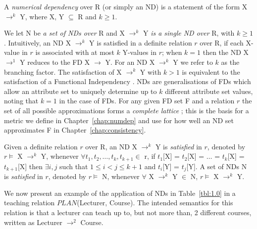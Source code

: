 \begin{definition}
\begin{rm}
A {\em numerical dependency} over R (or simply an ND)
is a statement of the form X $\to^k$ Y, where X, Y $\subseteq$ R and $k \ge 1$.
\end{rm}
\end{definition}
\smallskip
{}
We let N be {\em a set of NDs over} R and X $\to^k$ Y 
{\em is a single ND over} R, with $k \ge 1$.
Intuitively, an ND X $\to^k$ Y is satisfied in a definite relation $r$ over R,
if each X-value in $r$ is associated with at most $k$ Y-values in $r$;
when $k = 1$ then the ND X $\to^1$ Y reduces to the FD X $\to$ Y. For
an ND X $\to^k$ Y we refer to $k$ as the branching factor. The 
satisfaction of X $\to^k$ Y with $k > 1$ is equivalent to the
satisfaction of a Functional Independency \cite{gl90}.
NDs are generalisations of FDs which
allow an attribute set to uniquely determine up to $k$ different attribute
set values, noting that $k = 1$ in the case of FDs. For any given FD
set F and a relation $r$ the set of all possible approximations forms a
{\em complete lattice} \cite{dp90}; this is the basis for a metric we define
in Chapter~\ref{chap:numdep} and use for how well an ND set
approximates F in Chapter~\ref{chap:consistency}. 


\begin{definition}[Satisfaction of an ND]\label{def:sat-nd}
\begin{rm}
Given a definite relation $r$ over R,
an ND X $\to^k$ Y is {\em satisfied} in $r$,
denoted by $r \models$ X $\to^k$ Y, whenever
$\forall t_1, t_2, \ldots, t_k, t_{k+1} \in$ r, if 
$t_1$[X] = $t_2$[X] = $\ldots$ = $t_k$[X] = $t_{k+1}$[X] then 
$\exists i,j$ such that $1 \le i < j \le k+1$
and $t_i$[Y] = $t_j$[Y].
A set of NDs N is {\em satisfied} in $r$,
denoted by $r \models$ N, whenever
$\forall$ X $\to^k$ Y $\in$ N, $r \models$ X $\to^k$ Y.
\end{rm}
\end{definition}

We now present an
example of the application of NDs in Table~\ref{tbl:1.0}  in a
teaching relation $PLAN$(Lecturer, Course).  The intended semantics for
this relation is that a lecturer can teach up to, but not more than, 2
different courses, written as Lecturer $\to^2$ Course.
 
